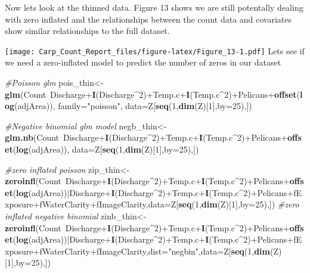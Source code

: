 \documentclass[]{article}
\newenvironment{Shaded}{\begin{snugshade}}{\end{snugshade}}
\newcommand{\KeywordTok}[1]{\textcolor[rgb]{0.13,0.29,0.53}{\textbf{{#1}}}}
\newcommand{\DataTypeTok}[1]{\textcolor[rgb]{0.13,0.29,0.53}{{#1}}}
\newcommand{\DecValTok}[1]{\textcolor[rgb]{0.00,0.00,0.81}{{#1}}}
\newcommand{\StringTok}[1]{\textcolor[rgb]{0.31,0.60,0.02}{{#1}}}
\newcommand{\CommentTok}[1]{\textcolor[rgb]{0.56,0.35,0.01}{\textit{{#1}}}}
\newcommand{\NormalTok}[1]{{#1}}
\begin{document}
Now lets look at the thinned data. Figure 13 shows we are still
potentally dealing with zero inflated and the relationships between the
count data and covariates show similar relationships to the full
dataset.

\texttt{[image: Carp\_Count\_Report\_files/figure-latex/Figure\_13-1.pdf]}
Lets see if we need a zero-inflated model to predict the number of zeros
in our dataset

\begin{Shaded}
\begin{Highlighting}[]
\CommentTok{#Poisson glm}
\NormalTok{pois_thin<-}\KeywordTok{glm}\NormalTok{(Count~Discharge+}\KeywordTok{I}\NormalTok{(Discharge^}\DecValTok{2}\NormalTok{)+Temp.c+}\KeywordTok{I}\NormalTok{(Temp.c^}\DecValTok{2}\NormalTok{)+Pelicans+}\KeywordTok{offset}\NormalTok{(}\KeywordTok{log}\NormalTok{(adjArea)), }\DataTypeTok{family=}\StringTok{"poisson"}\NormalTok{, }\DataTypeTok{data=}\NormalTok{Z[}\KeywordTok{seq}\NormalTok{(}\DecValTok{1}\NormalTok{,}\KeywordTok{dim}\NormalTok{(Z)[}\DecValTok{1}\NormalTok{],}\DataTypeTok{by=}\DecValTok{25}\NormalTok{),])}

\CommentTok{#Negative binomial glm model}
\NormalTok{negb_thin<-}\KeywordTok{glm.nb}\NormalTok{(Count~Discharge+}\KeywordTok{I}\NormalTok{(Discharge^}\DecValTok{2}\NormalTok{)+Temp.c+}\KeywordTok{I}\NormalTok{(Temp.c^}\DecValTok{2}\NormalTok{)+Pelicans+}\KeywordTok{offset}\NormalTok{(}\KeywordTok{log}\NormalTok{(adjArea)), }\DataTypeTok{data=}\NormalTok{Z[}\KeywordTok{seq}\NormalTok{(}\DecValTok{1}\NormalTok{,}\KeywordTok{dim}\NormalTok{(Z)[}\DecValTok{1}\NormalTok{],}\DataTypeTok{by=}\DecValTok{25}\NormalTok{),])}

\CommentTok{#zero inflated poisson}
\NormalTok{zip_thin<-}\KeywordTok{zeroinfl}\NormalTok{(Count~Discharge+}\KeywordTok{I}\NormalTok{(Discharge^}\DecValTok{2}\NormalTok{)+Temp.c+}\KeywordTok{I}\NormalTok{(Temp.c^}\DecValTok{2}\NormalTok{)+Pelicans+}\KeywordTok{offset}\NormalTok{(}\KeywordTok{log}\NormalTok{(adjArea))|Discharge+}\KeywordTok{I}\NormalTok{(Discharge^}\DecValTok{2}\NormalTok{)+Temp.c+}\KeywordTok{I}\NormalTok{(Temp.c^}\DecValTok{2}\NormalTok{)+Pelicans+fExposure+fWaterClarity+fImageClarity,}\DataTypeTok{data=}\NormalTok{Z[}\KeywordTok{seq}\NormalTok{(}\DecValTok{1}\NormalTok{,}\KeywordTok{dim}\NormalTok{(Z)[}\DecValTok{1}\NormalTok{],}\DataTypeTok{by=}\DecValTok{25}\NormalTok{),])}
\CommentTok{#zero inflated negative binomial}
\NormalTok{zinb_thin<-}\KeywordTok{zeroinfl}\NormalTok{(Count~Discharge+}\KeywordTok{I}\NormalTok{(Discharge^}\DecValTok{2}\NormalTok{)+Temp.c+}\KeywordTok{I}\NormalTok{(Temp.c^}\DecValTok{2}\NormalTok{)+Pelicans+}\KeywordTok{offset}\NormalTok{(}\KeywordTok{log}\NormalTok{(adjArea))|Discharge+}\KeywordTok{I}\NormalTok{(Discharge^}\DecValTok{2}\NormalTok{)+Temp.c+}\KeywordTok{I}\NormalTok{(Temp.c^}\DecValTok{2}\NormalTok{)+Pelicans+fExposure+fWaterClarity+fImageClarity,}\DataTypeTok{dist=}\StringTok{"negbin"}\NormalTok{,}\DataTypeTok{data=}\NormalTok{Z[}\KeywordTok{seq}\NormalTok{(}\DecValTok{1}\NormalTok{,}\KeywordTok{dim}\NormalTok{(Z)[}\DecValTok{1}\NormalTok{],}\DataTypeTok{by=}\DecValTok{25}\NormalTok{),])}
\end{Highlighting}
\end{Shaded}
\end{document}

